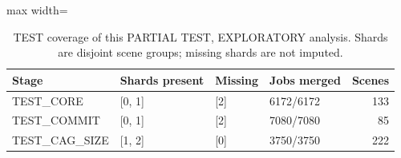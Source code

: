 \begin{table}[t]\centering\small
\caption{TEST coverage of this PARTIAL TEST, EXPLORATORY analysis. Shards are disjoint scene groups; missing shards are not imputed.}\label{tab:partial-cov}
\begin{adjustbox}{max width=\linewidth}
\begin{tabular}{llllr}
\toprule
Stage & Shards present & Missing & Jobs merged & Scenes \\
\midrule
TEST\_CORE & [0, 1] & [2] & 6172/6172 & 133 \\
TEST\_COMMIT & [0, 1] & [2] & 7080/7080 & 85 \\
TEST\_CAG\_SIZE & [1, 2] & [0] & 3750/3750 & 222 \\
\bottomrule
\end{tabular}
\end{adjustbox}
\end{table}

